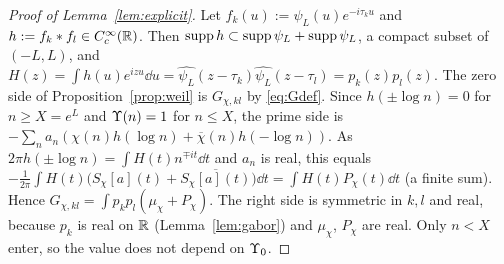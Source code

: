 \documentclass[11pt]{amsart}
\theoremstyle{definition}
\theoremstyle{remark}
\numberwithin{equation}{section}
\begin{document}
\begin{proof}[Proof of Lemma~\ref{lem:explicit}]
Let $f_k(u):=\psi_L(u)e^{-i\tau_ku}$ and $h:=f_k*f_l\in C_c^\infty(\mathbb R)$. Then $\operatorname{supp} h\subset\operatorname{supp}\psi_L+\operatorname{supp}\psi_L$, a compact subset of $(-L,L)$, and $H(z)=\int h(u)e^{izu}\dd u=\widehat{\psi_L}(z-\tau_k)\widehat{\psi_L}(z-\tau_l)=p_k(z)p_l(z)$. The zero side of Proposition~\ref{prop:weil} is $G_{\chi,kl}$ by \eqref{eq:Gdef}. Since $h(\pm\log n)=0$ for $n\ge X=e^L$ and $\Upsilon(n)=1$ for $n\le X$, the prime side is $-\sum_na_n(\chi(n)h(\log n)+\overline\chi(n)h(-\log n))$. As $2\pi h(\pm\log n)=\int H(t)n^{\mp it}\dd t$ and $a_n$ is real, this equals $-\frac1{2\pi}\int H(t)\big(S_\chi[a](t)+\overline{S_\chi[a](t)}\big)\dd t=\int H(t)P_\chi(t)\dd t$ (a finite sum). Hence $G_{\chi,kl}=\int p_kp_l(\mu_\chi+P_\chi)$. The right side is symmetric in $k,l$ and real, because $p_k$ is real on $\mathbb R$ (Lemma~\ref{lem:gabor}) and $\mu_\chi$, $P_\chi$ are real. Only $n<X$ enter, so the value does not depend on $\Upsilon_0$.
\end{proof}
\end{document}
